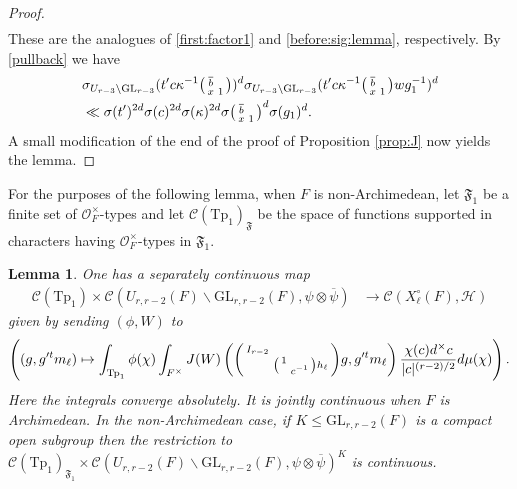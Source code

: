 \documentclass[12pt]{amsart}
\newtheorem{lem}[thm]{Lemma}
\theoremstyle{remark}
\numberwithin{equation}{section}
\newcommand{\GL}{\mathrm{GL}}
\newcommand{\lto}{\longrightarrow}
\newcommand{\OO}{\mathcal{O}}
\theoremstyle{definition}
\newenvironment{psmatrix}
  {\left(\begin{smallmatrix}}
  {\end{smallmatrix}\right)}
\numberwithin{equation}{subsection}
\begin{document}
\begin{proof}
\begin{align*}
\end{align*}
These are the analogues of \eqref{first:factor1} and \eqref{before:sig:lemma}, respectively.  
By \eqref{pullback} we have
\begin{align*}
&\sigma_{U_{r-3} \backslash \GL_{r-3}}(t'c\kappa^{-1}\begin{psmatrix} \overline{b} & \\ x & 1 \end{psmatrix})^{d}\sigma_{U_{r-3} \backslash \GL_{r-3}}(t'c\kappa^{-1}\begin{psmatrix} \overline{b} & \\ x & 1 \end{psmatrix}wg_1^{-1})^{d} \\&\ll \sigma(t')^{2d}\sigma(c)^{2d}\sigma(\kappa)^{2d}\sigma\begin{psmatrix} \overline{b}& \\ x & 1 \end{psmatrix}^d\sigma(g_1)^{d}.
\end{align*}
A small modification of the end of the proof of 
 Proposition \ref{prop:J} now yields the lemma.
\end{proof}
 

For the purposes of the following lemma, when $F$ is non-Archimedean, let $\mathfrak{F}_1$ be a finite set of $\OO_F^\times$-types and let $\mathcal{C}(\mathrm{Tp}_1)_{\mathfrak{F}}$ be the space of functions supported in characters having $\OO_F^\times$-types in $\mathfrak{F}_1.$
\begin{lem} \label{lem:map2X}
One has a separately continuous map
\begin{align*} 
\mathcal{C}(\mathrm{Tp}_1) \times \mathcal{C}(U_{r,r-2}(F) \backslash \GL_{r,r-2}(F),\psi \otimes \overline{\psi}) &\lto \mathcal{C}(X_\ell^\circ(F),\mathcal{H})
\end{align*}
given by sending $(\phi,W)$ to 
\begin{align*}
\left((g,g'^tm_\ell) \mapsto \int_{\mathrm{Tp}_1}\phi(\chi)\int_{F^\times}
J(W)\left(\begin{psmatrix}I_{r-2} & \\  & \begin{psmatrix} 1 & \\ & c^{-1}\end{psmatrix}h_\ell  \end{psmatrix}g,g'^tm_\ell \right)
\frac{\chi(c) d^\times c}{|c|^{(r-2)/2}}d\mu( \chi)\right).
\end{align*}
Here the integrals converge absolutely. It is jointly continuous when $F$ is Archimedean.  In the non-Archimedean case, if $K \leq \GL_{r,r-2}(F)$ is a compact open subgroup then the restriction to $\mathcal{C}(\mathrm{Tp}_1)_{\mathfrak{F}_1} \times \mathcal{C}(U_{r,r-2}(F) \backslash \GL_{r,r-2}(F),\psi \otimes \overline{\psi})^K$ is continuous.
\end{lem}
\end{document}

